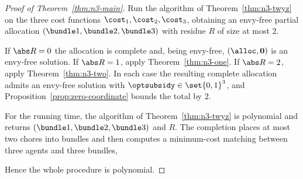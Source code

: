 \begin{proof}[Proof of Theorem~\ref{thm:n3-main}]
Run the algorithm of Theorem~\ref{thm:n3-twyz} on the three cost functions
$\cost_1,\cost_2,\cost_3$, obtaining an envy-free partial allocation
$(\bundle1,\bundle2,\bundle3)$ with residue $R$ of size at most $2$.

If $\abs R = 0$ the allocation is complete and, being envy-free,
$(\alloc, \mathbf{0})$ is an envy-free solution. If $\abs R = 1$, apply
Theorem~\ref{thm:n3-one}. If $\abs R = 2$, apply Theorem~\ref{thm:n3-two}. In
each case the resulting complete allocation admits an envy-free solution with
$\optsubsidy \in \set{0,1}^3$, and Proposition~\ref{prop:zero-coordinate}
bounds the total by $2$.

For the running time, the algorithm of Theorem~\ref{thm:n3-twyz} is polynomial
and returns $(\bundle1,\bundle2,\bundle3)$ and $R$. The completion places at
most two chores into bundles and then computes a minimum-cost matching between
three agents and three bundles, 



Hence the whole
procedure is polynomial.
\end{proof}
